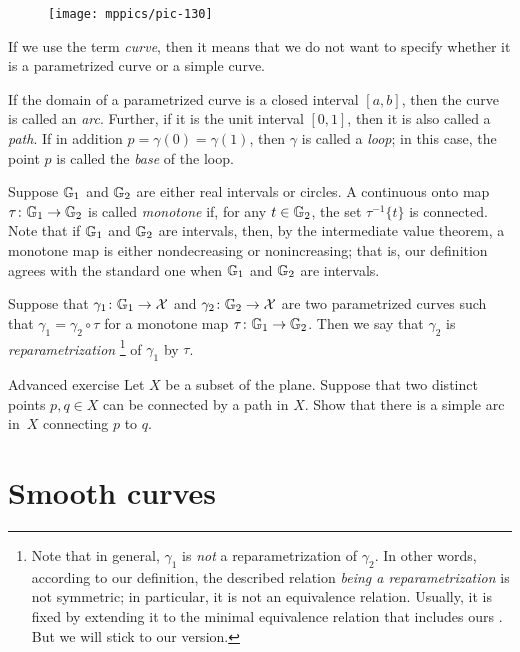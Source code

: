 \begin{wrapfigure}{o}{15 mm}
\vskip-3mm
\centering
\texttt{[image: mppics/pic-130]}
\end{wrapfigure}

If we use the term \emph{curve}, then it means that we do not want to specify whether it is a parametrized curve or a simple curve.

If the domain of a parametrized curve is a closed interval $[a,b]$, then the curve is called an \emph{arc}.
Further, if it is the unit interval $[0,1]$, then it is also called a \emph{path}.
If in addition $p=\gamma(0)=\gamma(1)$, then $\gamma$ is called a \emph{loop};
in this case, the point $p$ is called the \emph{base} of the loop.

Suppose $\mathbb{G}_1$ and $\mathbb{G}_2$ are either real intervals or circles.
A continuous onto map $\tau\colon\mathbb{G}_1\to\mathbb{G}_2$ is called \emph{monotone} if, for any $t\in \mathbb{G}_2$, the set $\tau^{-1}\{t\}$ is connected.
Note that if $\mathbb{G}_1$ and $\mathbb{G}_2$ are intervals, then, by the intermediate value theorem, a monotone map is either nondecreasing or nonincreasing;
that is, our definition agrees with the standard one when $\mathbb{G}_1$ and $\mathbb{G}_2$ are intervals.

Suppose that $\gamma_1\colon\mathbb{G}_1\to \mathcal{X}$ and $\gamma_2\colon\mathbb{G}_2\to \mathcal{X}$ are two parametrized curves such that 
$\gamma_1=\gamma_2\circ\tau$ for a monotone map $\tau\colon\mathbb{G}_1\to\mathbb{G}_2$.
Then we say that $\gamma_2$ is \emph{reparametrization}%
\footnote{Note that in general, $\gamma_1$ is {}\emph{not} a reparametrization of $\gamma_2$.
In other words, according to our definition, the described relation {}\emph{being a reparametrization} is not symmetric;
in particular, it is not an equivalence relation.
Usually, it is fixed by extending it to the minimal equivalence relation that includes ours \cite[2.5.1]{burago-burago-ivanov}.
But we will stick to our version.}
of $\gamma_1$ by $\tau$.


\begin{thm}{Advanced exercise}\label{aex:simple-curve}
Let $X$ be a subset of the plane.
Suppose that two distinct points $p,q\in X$ can be connected by a path in $X$.
Show that there is a simple arc in~$X$ connecting $p$ to $q$.
\end{thm}

\section{Smooth curves}

